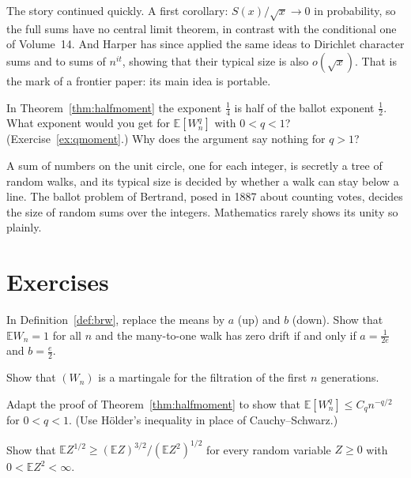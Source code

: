 The story continued quickly. A first corollary: $S(x)/\sqrt x\to0$ in probability, so the full sums have no central limit theorem, in contrast with the conditional one of Volume~14. And Harper has since applied the same ideas to Dirichlet character sums and to sums of $n^{it}$, showing that their typical size is also $o(\sqrt x)$. That is the mark of a frontier paper: its main idea is portable.

\begin{think}
In Theorem~\ref{thm:halfmoment} the exponent $\frac14$ is half of the ballot exponent $\frac12$. What exponent would you get for $\mathbb E[W_n^q]$ with $0<q<1$? (Exercise~\ref{ex:qmoment}.) Why does the argument say nothing for $q>1$?
\end{think}

\begin{beauty}
A sum of numbers on the unit circle, one for each integer, is secretly a tree of random walks, and its typical size is decided by whether a walk can stay below a line. The ballot problem of Bertrand, posed in 1887 about counting votes, decides the size of random sums over the integers. Mathematics rarely shows its unity so plainly.
\end{beauty}

\section{Exercises}

\begin{exercise}[$\star$]\label{ex:criticalparams}
In Definition~\ref{def:brw}, replace the means by $a$ (up) and $b$ (down). Show that $\mathbb EW_n=1$ for all $n$ and the many-to-one walk has zero drift if and only if $a=\frac1{2e}$ and $b=\frac e2$.
\end{exercise}

\begin{exercise}[$\star$]\label{ex:martingale}
Show that $(W_n)$ is a martingale for the filtration of the first $n$ generations.
\end{exercise}

\begin{exercise}[$\star\star$]\label{ex:qmoment}
Adapt the proof of Theorem~\ref{thm:halfmoment} to show that $\mathbb E[W_n^q]\le C_qn^{-q/2}$ for $0<q<1$. (Use Hölder's inequality in place of Cauchy--Schwarz.)
\end{exercise}

\begin{exercise}[$\star\star$]\label{ex:holderlower}
Show that $\mathbb EZ^{1/2}\ge(\mathbb EZ)^{3/2}/(\mathbb EZ^2)^{1/2}$ for every random variable $Z\ge0$ with $0<\mathbb EZ^2<\infty$.
\end{exercise}


